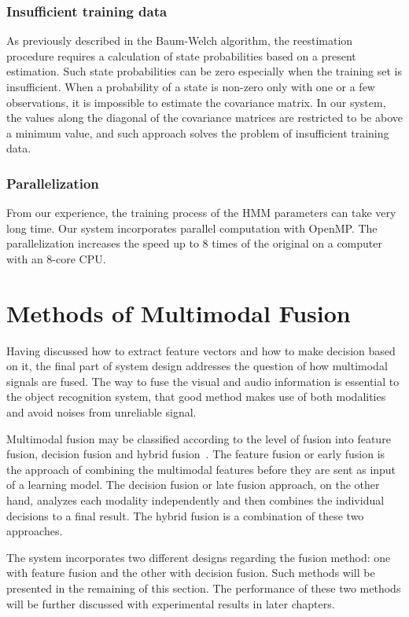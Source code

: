 \documentclass[12pt,final,twoside]{report}
\begin{document}
\subsubsection{Insufficient training data}

As previously described in the Baum-Welch algorithm, the reestimation procedure requires a calculation of state probabilities based on a present estimation. Such state probabilities can be zero especially when the training set is insufficient. When a probability of a state is non-zero only with one or a few observations, it is impossible to estimate the covariance matrix. In our system, the values along the diagonal of the covariance matrices are restricted to be above a minimum value, and such approach solves the problem of insufficient training data. 

\subsubsection{Parallelization}

From our experience, the training process of the HMM parameters can take very long time. Our system incorporates parallel computation with OpenMP. The parallelization increases the speed up to 8 times of the original on a computer with an 8-core CPU.

\section{Methods of Multimodal Fusion}
Having discussed how to extract feature vectors and how to make decision based on it, the final part of system design addresses the question of how multimodal signals are fused. The way to fuse the visual and audio information is essential to the object recognition system, that good method makes use of both modalities and avoid noises from unreliable signal.

Multimodal fusion may be classified according to the level of fusion into feature fusion, decision fusion and hybrid fusion~\cite{atrey_multimodal_2010}. The feature fusion or early fusion is the approach of combining the multimodal features before they are sent as input of a learning model. The decision fusion or late fusion approach, on the other hand, analyzes each modality independently and then combines the individual decisions to a final result. The hybrid fusion is a combination of these two approaches.

The system incorporates two different designs regarding the fusion method: one with feature fusion and the other with decision fusion. Such methods will be presented in the remaining of this section. The performance of these two methods will be further discussed with experimental results in later chapters.
\end{document}

